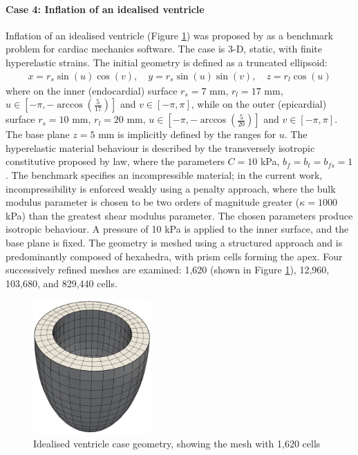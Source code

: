 \documentclass[sn-mathphys,Numbered]{sn-jnl}%
\begin{document}
\paragraph{Case 4: Inflation of an idealised ventricle}
Inflation of an idealised ventricle (Figure \ref{fig:ventricle}) was proposed by \citet{Land2015} as a benchmark problem for cardiac mechanics software.
The case is 3-D, static, with finite hyperelastic strains.
The initial geometry is defined as a truncated ellipsoid:
\begin{eqnarray}
	x = r_s \sin(u) \cos(v), \quad
	y = r_s \sin(u) \sin(v), \quad
	z = r_l \cos(u)
\end{eqnarray}
where on the inner (endocardial) surface $r_s =7$ mm, $r_l = 17$ mm, $u \in \left[-\pi, -\arccos \left( \frac{5}{17} \right) \right]$ and $v \in \left[-\pi, \pi \right]$, while on the outer (epicardial) surface $r_s =10$ mm, $r_l = 20$ mm, $u \in \left[-\pi, -\arccos \left( \frac{5}{20} \right) \right]$ and $v \in \left[-\pi, \pi \right]$.
The base plane $z = 5$ mm is implicitly defined by the ranges for $u$.
The hyperelastic material behaviour is described by the transversely isotropic constitutive proposed by \citet{Guccione} law, where the parameters $C = 10$ kPa, $b_f = b_t = b_{fs} = 1$.
The benchmark specifies an incompressible material; in the current work, incompressibility is enforced weakly using a penalty approach, where the bulk modulus parameter is chosen to be two orders of magnitude greater ($\kappa = 1000$ kPa) than the greatest shear modulus parameter.
The chosen parameters produce isotropic behaviour.
A pressure of 10 kPa is applied to the inner surface, and the base plane is fixed.
The geometry is meshed using a structured approach and is predominantly composed of hexahedra, with prism cells forming the apex.
Four successively refined meshes are examined: 1,620 (shown in Figure  \ref{fig:ventricle}), 12,960, 103,680, and 829,440 cells.
\begin{figure}[htbp]
   \centering
   \includegraphics[width=0.4\textwidth]{figures/ventricle} 
   \caption{Idealised ventricle case geometry, showing the mesh with 1,620 cells}
   \label{fig:ventricle}
\end{figure}
\end{document}
